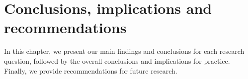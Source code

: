 \chapter{Conclusions, implications and recommendations}\label{ch6_title}

\graphicspath{{./ch-6-conclusion/images/}}

In this chapter, we present our main findings and conclusions for each research question, followed by the overall conclusions and implications for practice. Finally, we provide recommendations for future research.

